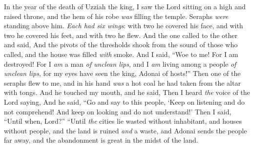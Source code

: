 \begin{biblechapter} %
 In the year of the death of Uzziah the king, I saw the Lord sitting on a high and raised throne, and the hem of his robe \textit{was} filling the temple.
\verse Seraphs \textit{were} standing above him. \textit{Each had six wings}: with two he covered his face, and with two he covered his feet, and with two he flew.
\verse And the one called to the other and said,
\verse And the pivots of the thresholds shook from the sound of those who called, and the house was filled \textit{with} smoke.
\verse And I said, “Woe to me! For I am destroyed! For I \textit{am} a man \textit{of unclean lips}, and I \textit{am} living among a people \textit{of unclean lips}, for my eyes have seen the king, Adonai of hosts!”
\verse Then one of the seraphs flew to me, and in his hand \textit{was} a hot coal he had taken from the altar with tongs.
\verse And he touched my mouth, and he said,
\verse Then I heard \textit{the} voice of the Lord saying,
\verse And he said, “Go and say to this people,
\verse ‘Keep on listening and do not comprehend! 
And keep on looking and do not understand!’
\verse Then I said, “Until when, Lord?”
\verse “Until \textit{the} cities lie wasted without inhabitant, 
and houses without people, 
and the land is ruined \textit{and} a waste,
\verse and Adonai sends the people far away, 
and the abandonment is great in the midst of the land.
\end{biblechapter}

